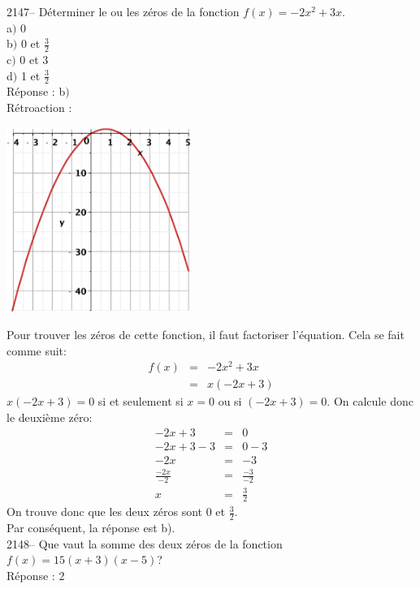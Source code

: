\documentclass[letterpaper, 12pt]{article}
\begin{document}
2147-- D\'eterminer le ou les z\'eros de la fonction $f(x)=-2x^{2}+3x$.\\

a$)$ 0\\[2mm]
b$)$ 0 et $\frac{3}{2}$\\[2mm]
c$)$ 0 et 3\\[2mm]
d$)$ 1 et $\frac{3}{2}$\\

R\'eponse : b$)$\\

R\'etroaction :\\
\begin{center}
 \includegraphics[width=6cm,bb=20 118 575 673]{Q2147.eps}
\end{center}
Pour trouver les z\'eros de cette fonction, il faut factoriser l'\'equation. Cela se fait comme suit:
\begin{eqnarray*}
 f(x)&=&-2x^{2}+3x\\
&=& x(-2x+3)
\end{eqnarray*}
$x(-2x+3) = 0$ si et seulement si $x=0$ ou si $(-2x+3)=0$. On calcule donc le deuxi\`eme z\'ero:
\begin{eqnarray*}
 -2x+3&=&0\\
 -2x+3-3&=&0-3\\
 -2x&=&-3\\[2mm]
 \frac{-2x}{-2}&=&\frac{-3}{-2}\\[2mm]
x&=&\frac{3}{2}
\end{eqnarray*}
On trouve donc que les deux z\'eros sont 0 et $\frac{3}{2}$.\\
Par cons\'equent, la r\'eponse est b).\\

2148-- Que vaut la somme des deux z\'eros de la fonction $f(x)=15(x+3)(x-5)$?\\

R\'eponse : 2\\
\end{document}

